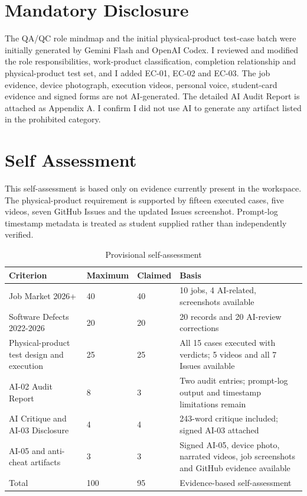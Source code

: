 \section{Mandatory Disclosure}

The QA/QC role mindmap and the initial physical-product test-case batch were initially generated by Gemini Flash and OpenAI Codex. I reviewed and modified the role responsibilities, work-product classification, completion relationship and physical-product test set, and I added EC-01, EC-02 and EC-03. The job evidence, device photograph, execution videos, personal voice, student-card evidence and signed forms are not AI-generated. The detailed AI Audit Report is attached as Appendix A. I confirm I did not use AI to generate any artifact listed in the prohibited category.

\section{Self Assessment}

This self-assessment is based only on evidence currently present in the workspace. The physical-product requirement is supported by fifteen executed cases, five videos, seven GitHub Issues and the updated Issues screenshot. Prompt-log timestamp metadata is treated as student supplied rather than independently verified.

\begin{table}[H]\centering\caption{Provisional self-assessment}

\begin{tabular}{p{}p{}p{}p{}}\toprule

Criterion & Maximum & Claimed & Basis \\\midrule

Job Market 2026+ & 40 & 40 & 10 jobs, 4 AI-related, screenshots available \\

Software Defects 2022-2026 & 20 & 20 & 20 records and 20 AI-review corrections \\

Physical-product test design and execution & 25 & 25 & All 15 cases executed with verdicts; 5 videos and all 7 Issues available \\

AI-02 Audit Report & 8 & 3 & Two audit entries; prompt-log output and timestamp limitations remain \\

AI Critique and AI-03 Disclosure & 4 & 4 & 243-word critique included; signed AI-03 attached \\

AI-05 and anti-cheat artifacts & 3 & 3 & Signed AI-05, device photo, narrated videos, job screenshots and GitHub evidence available \\

Total & 100 & 95 & Evidence-based self-assessment \\

\bottomrule\end{tabular}\end{table}
